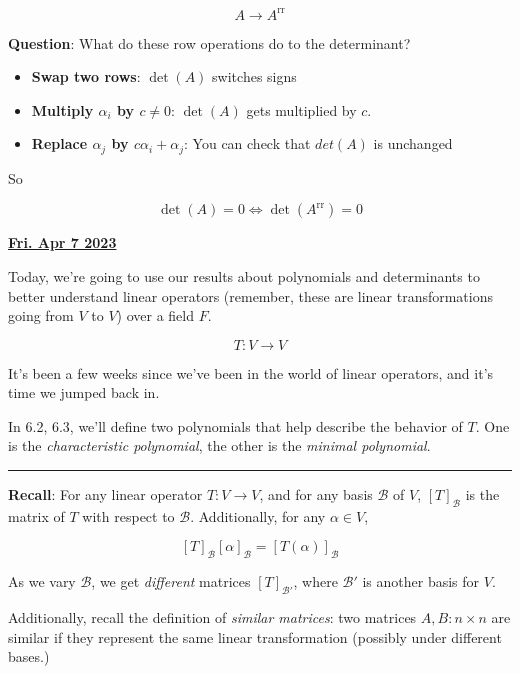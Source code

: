 \documentclass[12pt]{article}
\renewcommand{\date}[1]{\underline{\bf #1}}
\def\B{\mathcal B}
\newcommand*{\xdash}[1][3em]{\color{darkgray}\rule[0.5ex]{#1}{0.55pt}\color{black}}
\begin{document}
\begin{enumerate}
      \[
        A \to A^\text{rr}
      \]

      {\bf Question}: What do these row operations do to the determinant?

      \begin{itemize}
        \item {\bf Swap two rows}: $\det(A)$ switches signs
        \item {\bf Multiply $\alpha_i$ by $c \ne 0$}: $\det(A)$ gets multiplied
          by $c$.

        \item {\bf Replace $\alpha_j$ by $c \alpha_i + \alpha_j$}: You can check
          that $det(A)$ is unchanged
      \end{itemize}

      So

      \[
        \det(A) = 0 \Leftrightarrow \det(A^\text{rr}) = 0
      \]
  \end{enumerate}


  \date{Fri. Apr 7 2023}


  Today, we're going to use our results about polynomials and determinants to better
  understand linear operators (remember, these are linear transformations going
  from $V$ to $V$) over a field $F$.

  \[
    T: V \to V
  \]

  It's been a few weeks since we've been in the world of linear operators, and
  it's time we jumped back in.

  In 6.2, 6.3, we'll define two polynomials that help describe the behavior of
  $T$. One is the {\it characteristic polynomial}, the other is the {\it minimal
  polynomial}.

  \xdash[6em]

  {\bf Recall}: For any linear operator $T: V \to V$, and for any basis $\B$ of
  $V$, $[T]_\B$ is the matrix of $T$ with respect to $\B$. Additionally, for any
  $\alpha \in V$,

  \[
    [T]_\B [\alpha]_\B = [T(\alpha)]_\B
  \]

  As we vary $\B$, we get {\it different} matrices $[T]_{\B'}$, where $\B'$ is
  another basis for $V$.

  Additionally, recall the definition of {\it similar matrices}: two matrices
  $A, B: n \times n$ are similar if they represent the same linear
  transformation (possibly under different bases.)
\end{document}
